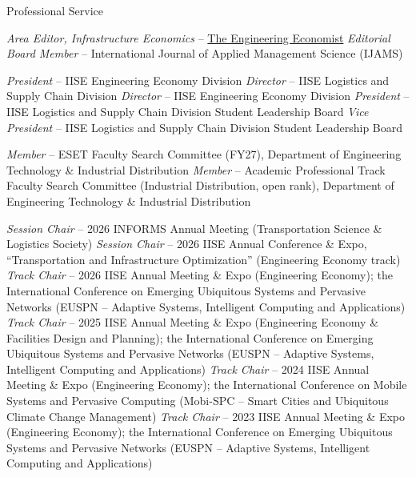 \begin{rubric}{Professional Service}

%
	\textit{Area Editor, Infrastructure Economics} -- \href{https://www.tandfonline.com/journals/utee20}{The Engineering Economist}
\entry*[2021 -- 2022]%
	\textit{Editorial Board Member} -- International Journal of Applied Management Science (IJAMS)

\vspace{5pt}

\entry*[2025 -- 2027]%
	\textit{President} -- IISE Engineering Economy Division
\entry*[2023 -- 2025]%
	\textit{Director} -- IISE Logistics and Supply Chain Division
\entry*[2022 -- 2024]%
	\textit{Director} -- IISE Engineering Economy Division
\entry*[2019 -- 2021]%
	\textit{President} -- IISE Logistics and Supply Chain Division Student Leadership Board 
\entry*[2018 -- 2019]%
	\textit{Vice President} -- IISE Logistics and Supply Chain Division Student Leadership Board

\vspace{5pt}

\entry*[2026 -- 2027]%
    \textit{Member} -- ESET Faculty Search Committee (FY27), Department of Engineering Technology \& Industrial Distribution
    \textit{Member} -- Academic Professional Track Faculty Search Committee (Industrial Distribution, open rank), Department of Engineering Technology \& Industrial Distribution

\vspace{5pt}

\entry*[2026]%
    \textit{Session Chair} -- 2026 INFORMS Annual Meeting (Transportation Science \& Logistics Society)
\entry*[2026]%
    \textit{Session Chair} -- 2026 IISE Annual Conference \& Expo, ``Transportation and Infrastructure Optimization'' (Engineering Economy track)
\entry*[2026]
    \textit{Track Chair} -- 2026 IISE Annual Meeting \& Expo (Engineering Economy); the  International Conference on Emerging Ubiquitous Systems and Pervasive Networks (EUSPN -- Adaptive Systems, Intelligent Computing and Applications)
\entry*[2025]
    \textit{Track Chair} -- 2025 IISE Annual Meeting \& Expo (Engineering Economy \& Facilities Design and Planning); the  International Conference on Emerging Ubiquitous Systems and Pervasive Networks (EUSPN -- Adaptive Systems, Intelligent Computing and Applications)
\entry*[2024]
    \textit{Track Chair} -- 2024 IISE Annual Meeting \& Expo (Engineering Economy); the  International Conference on Mobile Systems and Pervasive Computing (Mobi-SPC -- Smart Cities and Ubiquitous Climate Change Management)
\entry*[2023]
    \textit{Track Chair} -- 2023 IISE Annual Meeting \& Expo (Engineering Economy); the  International Conference on Emerging Ubiquitous Systems and Pervasive Networks (EUSPN -- Adaptive Systems, Intelligent Computing and Applications)


\end{rubric}
